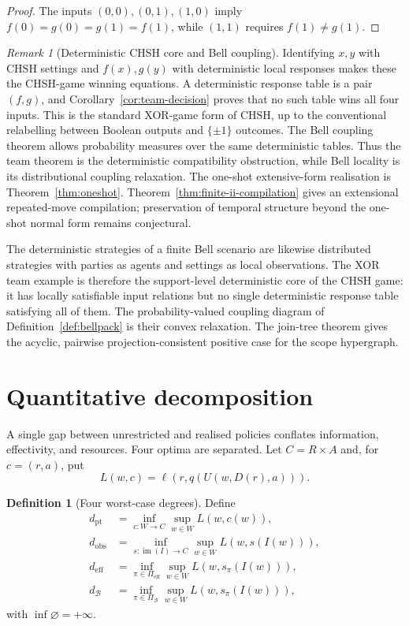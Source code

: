 \documentclass[11pt]{article}
\theoremstyle{plain}
\theoremstyle{definition}
\newtheorem{definition}[theorem]{Definition}
\theoremstyle{remark}
\newtheorem{remark}[theorem]{Remark}
\newcommand{\im}{\operatorname{im}}
\begin{document}
\begin{proof}
The inputs $(0,0),(0,1),(1,0)$ imply
$f(0)=g(0)=g(1)=f(1)$, while $(1,1)$ requires $f(1)\ne g(1)$.
\end{proof}

\begin{remark}[Deterministic CHSH core and Bell coupling]
Identifying $x,y$ with CHSH settings and $f(x),g(y)$ with deterministic local
responses makes these the CHSH-game winning equations. A deterministic response
table is a pair $(f,g)$, and Corollary~\ref{cor:team-decision} proves that no such
table wins all four inputs. This is the standard XOR-game form of CHSH, up to the conventional relabelling
between Boolean outputs and $\{\pm1\}$ outcomes. The Bell coupling theorem allows probability measures over the same deterministic tables. Thus the team theorem is the
deterministic compatibility obstruction, while Bell locality is its
distributional coupling relaxation. The one-shot extensive-form realisation is
Theorem~\ref{thm:oneshot}. Theorem~\ref{thm:finite-ii-compilation} gives
an extensional repeated-move compilation; preservation of temporal structure
beyond the one-shot normal form remains conjectural.
\end{remark}



The deterministic strategies of a finite Bell scenario are likewise distributed
strategies with parties as agents and settings as local observations. The XOR
team example is therefore the support-level deterministic core of the CHSH game:
it has locally satisfiable input relations but no single deterministic response
table satisfying all of them. The probability-valued coupling diagram of Definition~\ref{def:bellpack} is
their convex relaxation. The join-tree theorem gives the acyclic, pairwise
projection-consistent positive case for the scope hypergraph.




\section{Quantitative decomposition}\label{sec:quant}

A single gap between unrestricted and realised policies conflates information,
effectivity, and resources. Four optima are separated. Let
$C=R\times A$ and, for $c=(r,a)$, put
\[
L(w,c)=\ell(r,q(U(w,D(r),a))).
\]

\begin{definition}[Four worst-case degrees]\label{def:degree}
Define
\begin{align*}
d_{\mathrm{pt}}
&=\inf_{c:W\to C}\sup_{w\in W}L(w,c(w)),\\
d_{\mathrm{obs}}
&=\inf_{s:\im(I)\to C}\sup_{w\in W}L(w,s(I(w))),\\
d_{\mathrm{eff}}
&=\inf_{\pi\in\Pi_{\mathrm{eff}}}\sup_{w\in W}L(w,s_\pi(I(w))),\\
d_{\mathcal B}
&=\inf_{\pi\in\Pi_{\mathcal B}}\sup_{w\in W}L(w,s_\pi(I(w))),
\end{align*}
with $\inf\varnothing=+\infty$.
\end{definition}
\end{document}
